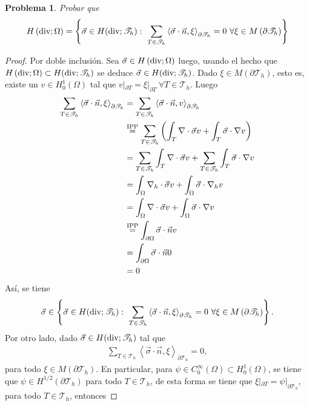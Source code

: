 \documentclass[10pt,a4paper]{report}
\newtheorem{pro}{Problema}
\newcommand{\Th}{\mathscr{T}_{h}}
\newcommand{\Hdiv}{H\left(\textup{div};\Omega\right)}
\newcommand{\Hdivt}{H(\textup{div};\mathscr{T}_{h})}
\providecommand{\PI}[2]{\left\langle #1,#2  \right\rangle}
\begin{document}
    \begin{pro}
    	Probar que 
    	\begin{align*}
    		\Hdiv = \left\{\vec{\sigma}\in\Hdivt:\ \sum_{T\in\mathscr{T}_{h}}\PI{\vec{\sigma}\cdot\vec{n}}{\xi}_{\partial\Th} = 0\ \forall\xi\in M\left(\partial\Th\right) \right\}
    	\end{align*}
    \end{pro}
    \begin{proof}
    	Por doble inclusión. Sea $\vec{\sigma}\in \Hdiv$ luego, usando el hecho que $\Hdiv\subset\Hdivt$ se deduce $\vec{\sigma}\in\Hdivt$. Dado $\xi\in M\left(\partial\Th\right)$, esto es, existe un $v\in H^{1}_{0}(\Omega)$ tal que $v|_{\partial T} = \xi|_{\partial T}\  \forall T\in\Th$. Luego
    	\begin{align*}
    		\sum_{T\in\mathscr{T}_{h}}\PI{\vec{\sigma}\cdot\vec{n}}{\xi}_{\partial\Th} &= \sum_{T\in\mathscr{T}_{h}}\PI{\vec{\sigma}\cdot\vec{n}}{v}_{\partial\Th}\\ &\overset{\textup{IPP}}{=} \sum_{T\in\mathscr{T}_{h}}\left( \int_{T}\nabla\cdot\vec{\sigma} v + \int_{T}\vec{\sigma}\cdot\nabla v \right)\\
    		&= \sum_{T\in\mathscr{T}_{h}} \int_{T}\nabla\cdot\vec{\sigma} v + \sum_{T\in\mathscr{T}_{h}} \int_{T}\vec{\sigma}\cdot\nabla v \\
    		&= \int_{\Omega}\nabla_{h}\cdot\vec{\sigma} v +  \int_{\Omega}\vec{\sigma}\cdot\nabla_{h} v\\
    		&= \int_{\Omega}\nabla\cdot\vec{\sigma} v +  \int_{\Omega}\vec{\sigma}\cdot\nabla v\\
    		&\overset{\textup{IPP}}{=} \int_{\partial\Omega} \vec{\sigma}\cdot\vec{n}v\\
    		&= \int_{\partial\Omega} \vec{\sigma}\cdot\vec{n}0\\
    		&= 0
    	\end{align*}
        Así, se tiene
        \begin{align*}
        	\vec{\sigma}\in \left\{\vec{\sigma}\in\Hdivt:\ \sum_{T\in\mathscr{T}_{h}}\PI{\vec{\sigma}\cdot\vec{n}}{\xi}_{\partial\Th} = 0\ \forall\xi\in M\left(\partial\Th\right) \right\}.
        \end{align*}
        Por otro lado, dado $\vec{\sigma}\in\Hdivt$ tal que
        \begin{align*}
        	\sum_{T\in\mathscr{T}_{h}}\PI{\vec{\sigma}\cdot\vec{n}}{\xi}_{\partial\Th} = 0,
        \end{align*}
         para todo $\xi\in M\left(\partial\Th\right)$. En particular, para $\psi\in C^{\infty}_{0}(\Omega)\subset H^{1}_{0}(\Omega)$, se tiene que $\psi\in H^{1/2}(\partial \Th)$ para todo $T\in\Th$, de esta forma se tiene que $\xi|_{\partial T} = \psi|_{\partial\Th}$, para todo $T\in \Th$, entonces

\end{proof}
\end{document}
